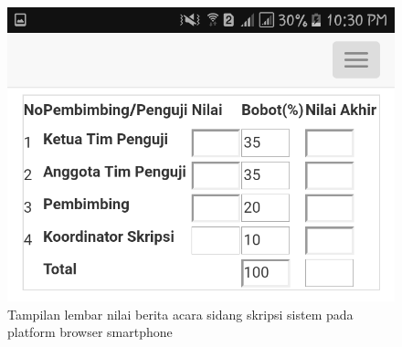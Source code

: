 \begin{figure}[H]
	\centering
	\includegraphics[scale=0.2]{Gambar/hp_nilai}
	\caption{Tampilan lembar nilai berita acara sidang skripsi sistem pada platform browser smartphone}
	\label{fig:hp_nilai}
\end{figure}

